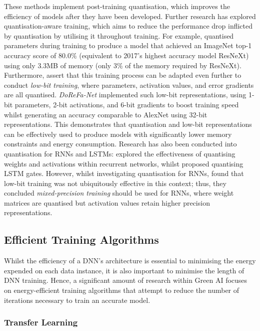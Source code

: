 \documentclass[a4paper, 11pt]{report}
\begin{document}
    These methods implement post-training quantisation, which improves the efficiency of models after they have been developed. Further research has explored quantisation-aware training, which aims to reduce the performance drop inflicted by quantisation by utilising it throughout training. For example, \citet{fan-2020b} quantised parameters during training to produce a model that achieved an ImageNet top-1 accuracy score of $80.0\%$ (equivalent to 2017's highest accuracy model ResNeXt) using only $3.3$MB of memory (only $3\%$ of the memory required by ResNeXt). Furthermore, \citet{cai-2022} assert that this training process can be adapted even further to conduct \emph{low-bit training}, where parameters, activation values, and error gradients are all quantised. \emph{DoReFa-Net} \citep{zhou-2016} implemented such low-bit representations, using 1-bit parameters, 2-bit activations, and 6-bit gradients to boost training speed whilst generating an accuracy comparable to AlexNet using 32-bit representations. This demonstrates that quantisation and low-bit representations can be effectively used to produce models with significantly lower memory constraints and energy consumption. Research has also been conducted into quantisation for RNNs and LSTMs: \citet{hubara-2016} explored the effectiveness of quantising weights and activations within recurrent networks, whilst \citet{he-2016} proposed quantising LSTM gates. However, whilst investigating quantisation for RNNs, \citet{ott-2017} found that low-bit training was not ubiquitously effective in this context; thus, they concluded \emph{mixed-precision training} should be used for RNNs, where weight matrices are quantised but activation values retain higher precision representations.


    \subsection{Efficient Training Algorithms}
    \label{section: efficient-training}

    Whilst the efficiency of a DNN's architecture is essential to minimising the energy expended on each data instance, it is also important to minimise the length of DNN training. Hence, a significant amount of research within Green AI focuses on energy-efficient training algorithms that attempt to reduce the number of iterations necessary to train an accurate model.


    \subsubsection{Transfer Learning}
\end{document}
